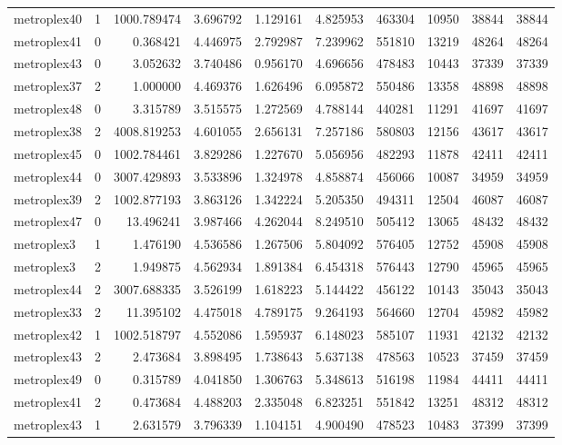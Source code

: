 \documentclass[../../../thesis.tex]{subfiles}
\begin{document}
\begin{longtable}{|l|r|r|r|r|r|r|r|r|r|}
metroplex40 & 1 & 1000.789474 & 3.696792 & 1.129161 & 4.825953 & 463304 & 10950 & 38844 & 38844 \\
metroplex41 & 0 & 0.368421 & 4.446975 & 2.792987 & 7.239962 & 551810 & 13219 & 48264 & 48264 \\
metroplex43 & 0 & 3.052632 & 3.740486 & 0.956170 & 4.696656 & 478483 & 10443 & 37339 & 37339 \\
metroplex37 & 2 & 1.000000 & 4.469376 & 1.626496 & 6.095872 & 550486 & 13358 & 48898 & 48898 \\
metroplex48 & 0 & 3.315789 & 3.515575 & 1.272569 & 4.788144 & 440281 & 11291 & 41697 & 41697 \\
metroplex38 & 2 & 4008.819253 & 4.601055 & 2.656131 & 7.257186 & 580803 & 12156 & 43617 & 43617 \\
metroplex45 & 0 & 1002.784461 & 3.829286 & 1.227670 & 5.056956 & 482293 & 11878 & 42411 & 42411 \\
metroplex44 & 0 & 3007.429893 & 3.533896 & 1.324978 & 4.858874 & 456066 & 10087 & 34959 & 34959 \\
metroplex39 & 2 & 1002.877193 & 3.863126 & 1.342224 & 5.205350 & 494311 & 12504 & 46087 & 46087 \\
metroplex47 & 0 & 13.496241 & 3.987466 & 4.262044 & 8.249510 & 505412 & 13065 & 48432 & 48432 \\
metroplex3 & 1 & 1.476190 & 4.536586 & 1.267506 & 5.804092 & 576405 & 12752 & 45908 & 45908 \\
metroplex3 & 2 & 1.949875 & 4.562934 & 1.891384 & 6.454318 & 576443 & 12790 & 45965 & 45965 \\
metroplex44 & 2 & 3007.688335 & 3.526199 & 1.618223 & 5.144422 & 456122 & 10143 & 35043 & 35043 \\
metroplex33 & 2 & 11.395102 & 4.475018 & 4.789175 & 9.264193 & 564660 & 12704 & 45982 & 45982 \\
metroplex42 & 1 & 1002.518797 & 4.552086 & 1.595937 & 6.148023 & 585107 & 11931 & 42132 & 42132 \\
metroplex43 & 2 & 2.473684 & 3.898495 & 1.738643 & 5.637138 & 478563 & 10523 & 37459 & 37459 \\
metroplex49 & 0 & 0.315789 & 4.041850 & 1.306763 & 5.348613 & 516198 & 11984 & 44411 & 44411 \\
metroplex41 & 2 & 0.473684 & 4.488203 & 2.335048 & 6.823251 & 551842 & 13251 & 48312 & 48312 \\
metroplex43 & 1 & 2.631579 & 3.796339 & 1.104151 & 4.900490 & 478523 & 10483 & 37399 & 37399 \\

\end{longtable}
\end{document}
